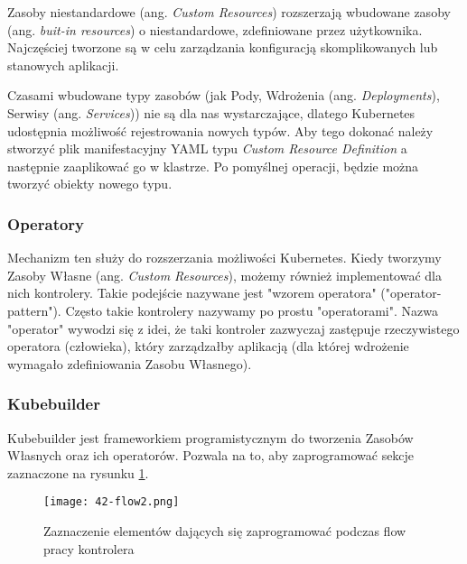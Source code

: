 Zasoby niestandardowe (ang. \textit{Custom Resources}) rozszerzają wbudowane zasoby (ang. \textit{buit-in resources}) o niestandardowe, zdefiniowane przez użytkownika. Najczęściej tworzone są w celu zarządzania konfiguracją skomplikowanych lub stanowych aplikacji. 

Czasami wbudowane typy zasobów (jak Pody, Wdrożenia (ang. \textit{Deployments}), Serwisy (ang. \textit{Services})) nie są dla nas wystarczające, dlatego Kubernetes udostępnia możliwość rejestrowania nowych typów. Aby tego dokonać należy stworzyć plik manifestacyjny YAML typu \textit{Custom Resource Definition} a następnie zaaplikować go w klastrze. Po pomyślnej operacji, będzie można tworzyć obiekty nowego typu.

\subsubsection{Operatory}

Mechanizm ten służy do rozszerzania możliwości Kubernetes. Kiedy tworzymy Zasoby Własne (ang. \textit{Custom Resources}), możemy również implementować dla nich kontrolery. Takie podejście nazywane jest "wzorem operatora" ("operator-pattern"). Często takie kontrolery nazywamy po prostu "operatorami". Nazwa "operator" wywodzi się z idei, że taki kontroler zazwyczaj zastępuje rzeczywistego operatora (człowieka), który zarządzałby aplikacją (dla której wdrożenie wymagało zdefiniowania Zasobu Własnego).

\subsubsection{Kubebuilder}

Kubebuilder jest frameworkiem programistycznym do tworzenia Zasobów Własnych oraz ich operatorów. Pozwala na to, aby zaprogramować sekcje zaznaczone na rysunku \ref{fig:42-flow2}.


\begin{figure}[!h]
    \centering \texttt{[image: 42-flow2.png]}
    \caption{Zaznaczenie elementów dających się zaprogramować podczas flow pracy kontrolera}\label{fig:42-flow2}
\end{figure}